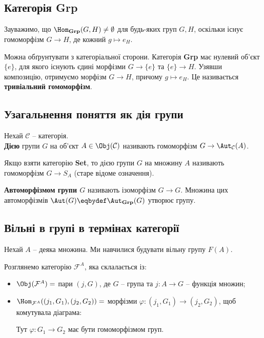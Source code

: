 \documentclass{math_library}
\begin{document}
\subsection{Категорія \textbf{Grp}}
Зауважимо, що $\Hom_\textbf{Grp}(G,H) \neq \emptyset$ для будь-яких груп $G,H$, оскільки існує гомоморфізм $G \to H$, де кожний $g \mapsto e_H$.

Можна обґрунтувати з категоріальної сторони. Категорія \textbf{Grp} має нулевий об'єкт $\{e\}$, для якого існують єдині морфізми $G \to \{e\}$ та $\{e\} \to H$. Узявши композицію, отримуємо морфізм $G \to H$, причому $g \mapsto e_H$. Це називається \textbf{тривіальний гомоморфізм}.



\subsection{Узагальнення поняття як дія групи}
\begin{definition}
Нехай $\mathcal{C}$ -- категорія.\\
\textbf{Дією} групи $G$ на об'єкт $A \in \Obj(\mathcal{C})$ називають гомоморфізм $G \to \Aut_\mathcal{C}(A)$.
\end{definition}

Якщо взяти категорію \textbf{Set}, то дією групи $G$ на множину $A$ називають гомоморфізм $G \to S_A$ (старе відоме означення).

\begin{definition}
\textbf{Автоморфізмом групи $G$} називають ізоморфізм $G \to G$. Множина цих автоморфізмів $\Aut(G) \eqbydef \Aut_\textbf{Grp}(G)$ утворює групу.
\end{definition}

\subsection{Вільні в групі в термінах категорії}
Нехай $A$ -- деяка множина. Ми навчилися будувати вільну групу $F(A)$.

Розглянемо категорію $\mathcal{F}^A$, яка склалається із:
\begin{itemize}[nosep]
\item $\Obj(\mathcal{F}^A) =$ пари $(j,G)$, де $G$ -- група та $j \colon A \to G$ -- функція множин;
\item $\Hom_{\mathcal{F}^A}((j_1,G_1),(j_2,G_2)) =$ морфізми $\varphi \colon (j_1,G_1) \to (j_2,G_2)$, щоб комутувала діаграма:
\begin{figure}[H]
\centering
{}
\end{figure}
Тут $\varphi \colon G_1 \to G_2$ має бути гомоморфізмом груп.
\end{itemize}
\end{document}
